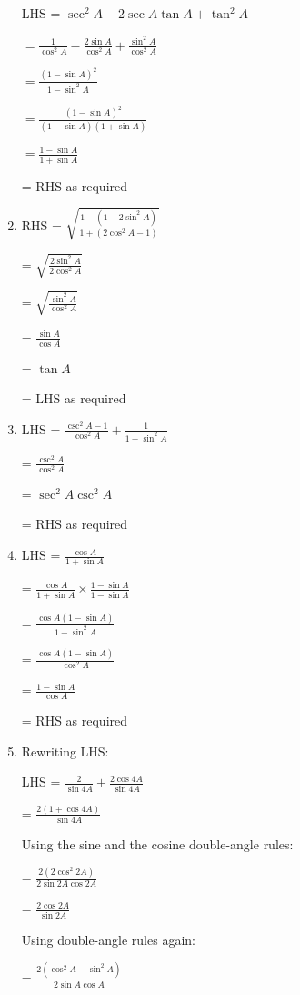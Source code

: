 \documentclass[../main.tex]{subfiles}
\begin{document}
\begin{enumerate}
    LHS = $\sec^2{A}-2\sec{A}\tan{A}+\tan^2{A}$

    $= \frac{1}{\cos^2{A}}-\frac{2\sin{A}}{\cos^2{A}}+\frac{\sin^2{A}}{\cos^2{A}}$

    $= \frac{(1-\sin{A})^2}{1-\sin^2{A}}$

    $= \frac{(1-\sin{A})^2}{(1-\sin{A})(1+\sin{A})}$

    $= \frac{1-\sin{A}}{1+\sin{A}}$
    
    = RHS as required

    \item RHS = $\sqrt{\frac{1-(1-2\sin^2{A})}{1+(2\cos^2{A}-1)}}$

    = $\sqrt{\frac{2\sin^2{A}}{2\cos^2{A}}}$

    = $\sqrt{\frac{\sin^2{A}}{\cos^2{A}}}$

    = $\frac{\sin{A}}{\cos{A}}$

    = $\tan{A}$

    = LHS as required

    \item LHS = $\frac{\csc^2{A}-1}{\cos^2{A}}+\frac{1}{1-\sin^2{A}}$

    = $\frac{\csc^2{A}}{\cos^2{A}}$

    = $\sec^2{A}\csc^2{A}$

    = RHS as required

    \item LHS = $\frac{\cos{A}}{1+\sin{A}}$

    = $\frac{\cos{A}}{1+\sin{A}} \times \frac{1-\sin{A}}{1-\sin{A}}$

    = $\frac{\cos{A}(1-\sin{A})}{1-\sin^2{A}}$

    = $\frac{\cos{A}(1-\sin{A})}{\cos^2{A}}$

    = $\frac{1-\sin{A}}{\cos{A}}$

    = RHS as required

    \item Rewriting LHS:

    LHS = $\frac{2}{\sin{4A}}+\frac{2\cos{4A}}{\sin{4A}}$

    = $\frac{2(1+\cos{4A})}{\sin{4A}}$

    Using the sine and the cosine double-angle rules:

    = $\frac{2(2\cos^2{2A})}{2\sin{2A}\cos{2A}}$

    = $\frac{2\cos{2A}}{\sin{2A}}$

    Using double-angle rules again:

    = $\frac{2(\cos^2{A}-\sin^2{A})}{2\sin{A}\cos{A}}$


\end{enumerate}
\end{document}

